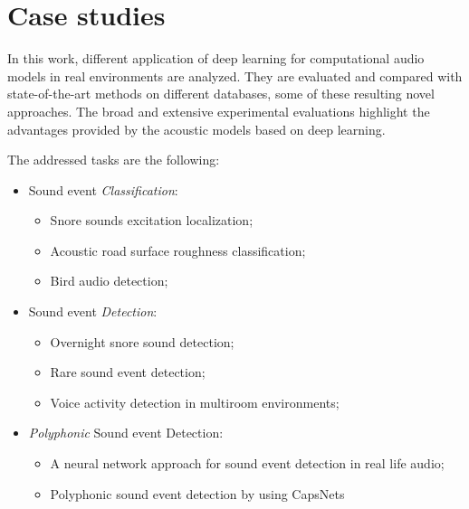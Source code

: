 


\section{Case studies}
In this work, different application of deep learning for computational audio models in real environments are analyzed. They are evaluated and compared with state-of-the-art methods on different databases, some of these resulting novel approaches. The broad and extensive experimental evaluations highlight the advantages provided by the acoustic models based on deep learning.

The addressed tasks are the following:
\begin{itemize}
	\item Sound event \textit{Classification}:
	\begin{itemize}
		\item Snore sounds excitation localization;
		\item Acoustic road surface roughness classification;
		\item Bird audio detection;
	\end{itemize}
	\item Sound event \textit{Detection}:
	\begin{itemize}
		\item Overnight snore sound detection;
		\item Rare sound event detection;
		\item Voice activity detection in multiroom environments;
	\end{itemize}
	\item \textit{Polyphonic} Sound event Detection:
	\begin{itemize}
		\item A neural network approach for sound event detection in real life audio;
		\item Polyphonic sound event detection by using CapsNets		
	\end{itemize}
\end{itemize}




